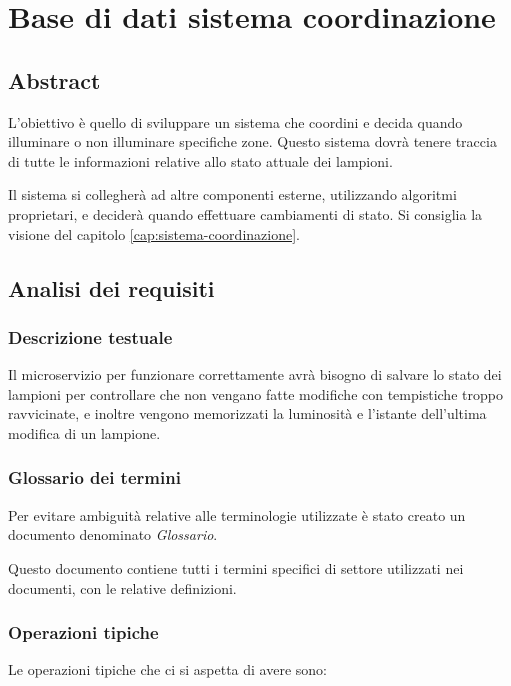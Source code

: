 \section{Base di dati sistema coordinazione}

\subsection{Abstract}

L'obiettivo è quello di sviluppare un sistema che coordini e decida quando illuminare o non illuminare specifiche zone. Questo sistema dovrà tenere traccia di tutte le informazioni relative allo stato attuale dei lampioni.

Il sistema si collegherà ad altre componenti esterne, utilizzando algoritmi proprietari, e deciderà quando effettuare cambiamenti di stato. Si consiglia la visione del capitolo \ref{cap:sistema-coordinazione}.

\subsection{Analisi dei requisiti}

\subsubsection{Descrizione testuale}

Il microservizio per funzionare correttamente avrà bisogno di salvare lo stato dei lampioni per controllare che non vengano fatte modifiche con tempistiche troppo ravvicinate, e inoltre vengono memorizzati la luminosità e l'istante dell'ultima modifica di un lampione. 

\subsubsection{Glossario dei termini}

Per evitare ambiguità relative alle terminologie utilizzate è stato creato un documento denominato \textit{Glossario}.

Questo documento contiene tutti i termini specifici di settore utilizzati nei documenti, con le relative definizioni.

\subsubsection{Operazioni tipiche}

Le operazioni tipiche che ci si aspetta di avere sono:

